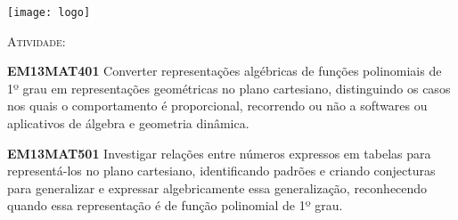 \documentclass[10 pt,usenames,dvipsnames, oneside]{article}
\begin{document}
\begin{center}
  \begin{minipage}[l]{3cm}
\texttt{[image: logo]}    
\end{minipage}\hfill
\begin{minipage}[r]{.8\textwidth}
 {\Large \scshape Atividade: }  
\end{minipage}
\end{center}
\vspace{.2cm}

\ifdefined\prof
\begin{objetivos}
\item \textbf{EM13MAT401} Converter representações algébricas de funções polinomiais de 1º grau em representações geométricas no plano cartesiano, distinguindo os casos nos quais o comportamento é proporcional, recorrendo ou não a softwares ou aplicativos de álgebra e geometria dinâmica.
\item \textbf{EM13MAT501} Investigar relações entre números expressos em tabelas para representá-los no plano cartesiano, identificando padrões e criando conjecturas para generalizar e expressar algebricamente essa generalização, reconhecendo quando essa representação é de função polinomial de 1º grau.
\end{objetivos}
\end{document}
